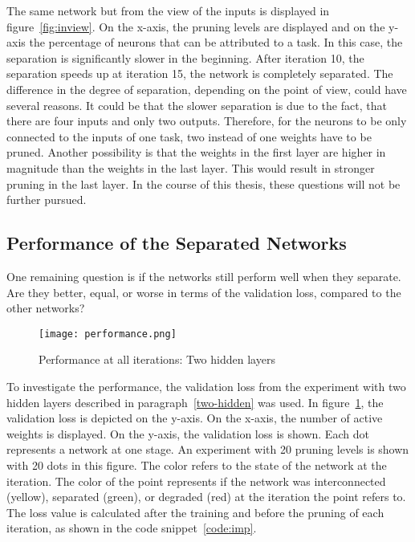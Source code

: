 The same network but from the view of the inputs is displayed in figure~\ref{fig:inview}.
On the x-axis, the pruning levels are displayed and on the y-axis the percentage of neurons that can be attributed to a task.
In this case, the separation is significantly slower in the beginning.
After iteration 10, the separation speeds up at iteration 15, the network is completely separated.
The difference in the degree of separation, depending on the point of view, could have several reasons.
It could be that the slower separation is due to the fact, that there are four inputs and only two outputs.
Therefore, for the neurons to be only connected to the inputs of one task, two instead of one weights have to be pruned.
Another possibility is that the weights in the first layer are higher in magnitude than the weights in the last layer.
This would result in stronger pruning in the last layer.
In the course of this thesis, these questions will not be further pursued.

\subsection{Performance of the Separated Networks}
One remaining question is if the networks still perform well when they separate.
Are they better, equal, or worse in terms of the validation loss, compared to the other networks?

\begin{figure}[ht]
    \centering
    \texttt{[image: performance.png]}
    \caption{
        Performance at all iterations: Two hidden layers
    }\label{fig:performance}
\end{figure}

To investigate the performance, the validation loss from the experiment with two hidden layers described in paragraph~\ref{two-hidden} was used.
In figure~\ref{fig:performance}, the validation loss is depicted on the y-axis.
On the x-axis, the number of active weights is displayed.
On the y-axis, the validation loss is shown.
Each dot represents a network at one stage.
An experiment with 20 pruning levels is shown with 20 dots in this figure.
The color refers to the state of the network at the iteration.
The color of the point represents if the network was interconnected (yellow), separated (green), or degraded (red) at the iteration the point refers to.
The loss value is calculated after the training and before the pruning of each iteration, as shown in the code snippet~\ref{code:imp}.

